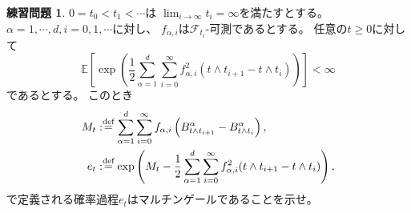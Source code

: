 \documentclass[uplatex]{jsarticle}
\theoremstyle{definition}
\newtheorem{prob}[prob]{練習問題}
\def\E{\mathbb{E}}
\def\mcF{\mathcal{F}}
\def\dfn{:\overset{\mbox{{\scriptsize def}}}{=}}
\begin{document}
\begin{prob}\label{prob: 3.6}
  \(0 = t_0 < t_1 < \cdots\)は
  \(\lim_{i\to \infty}t_i = \infty\)を満たすとする。
  \(\alpha = 1,\cdots , d, i = 0,1, \cdots \)に対し、
  \(f_{\alpha,i}\)は\(\mcF_{t_i}\)-可測であるとする。
  任意の\(t\geq 0\)に対して
  \[
  \E\left[ \exp\left( \frac{1}{2}\sum_{\alpha=1}^d\sum_{i=0}^\infty
  f_{\alpha,i}^2(t\wedge t_{i+1}-t\wedge t_i) \right)\right] < \infty
  \]
  であるとする。
  このとき
  \begin{align*}
    M_t &\dfn \sum_{\alpha=1}^d\sum_{i=0}^\infty
    f_{\alpha,i}\left(B_{t\wedge t_{i+1}}^\alpha - B_{t\wedge t_i}^\alpha \right) , \\
    e_t &\dfn \exp \left( M_t - \frac{1}{2} \sum_{\alpha=1}^d\sum_{i=0}^\infty
    f_{\alpha,i}^2(t\wedge t_{i+1} - t\wedge t_i) \right) , \\
  \end{align*}
  で定義される確率過程\(e_t\)はマルチンゲールであることを示せ。
\end{prob}
\end{document}
